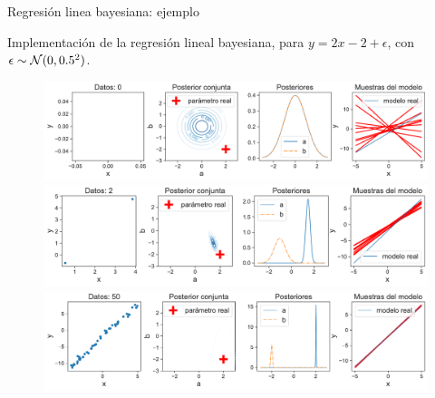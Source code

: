\documentclass[9pt, handout]{beamer}
\begin{document}
\begin{frame}{Regresión linea bayesiana: ejemplo}

Implementación de la regresión lineal bayesiana, para $y = 2x-2	+ \epsilon$, con $\epsilon\sim{\mathcal N}(0,0.5^2)$. 
	
	\begin{figure}[H]
	\includegraphics[height=0.25\textheight,frame]{../../img/cap2_bayesian_lin_reg_0.pdf}\\
	\includegraphics[height=0.25\textheight,frame]{../../img/cap2_bayesian_lin_reg_2.pdf}\\
	\includegraphics[height=0.25\textheight,frame]{../../img/cap2_bayesian_lin_reg_50.pdf}
\end{figure}

\end{frame}
\end{document}
